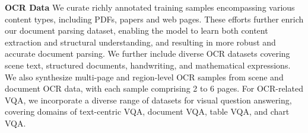 \documentclass{article}
\begin{document}
\textbf{OCR Data}
We curate richly annotated training samples encompassing various content types, including PDFs, papers and web pages. These efforts further enrich our document parsing dataset, enabling the model to learn both content extraction and structural understanding, and resulting in more robust and accurate document parsing.
We further include diverse OCR datasets covering scene text, structured documents, handwriting, and mathematical expressions.
We also synthesize multi-page and region-level OCR samples from scene and document OCR data, with each sample comprising 2 to 6 pages. 
For OCR-related VQA, we incorporate a diverse range of datasets for visual question answering, covering domains of text-centric VQA, document VQA, table VQA, and chart VQA.





\end{document}
